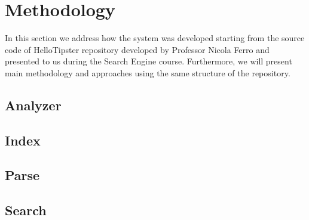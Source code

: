 \section{Methodology}
\label{sec:methodology}
In this section we address how the system was developed starting from the source code of
HelloTipster\cite{tipser} repository developed by Professor Nicola Ferro
and presented to us during the Search Engine course.
Furthermore, we will present main methodology and approaches
using the same structure of the repository\cite{jihuming}.
\subsection{Analyzer}

\subsection{Index}

\subsection{Parse}

\subsection{Search}